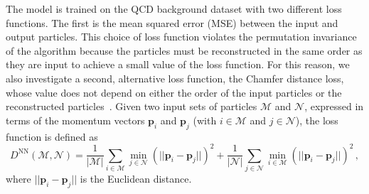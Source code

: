 \documentclass[letterpaper,11pt]{article}
\begin{document}
The model is trained on the QCD background dataset with two different loss functions. 
The first is the mean squared error (MSE) between the input and output particles. 
This choice of loss function violates the permutation invariance of the algorithm because the particles must be reconstructed in the same order as they are input to achieve a small value of the loss function.
For this reason, we also investigate a second, alternative loss function, the Chamfer distance loss, whose value does not depend on either the order of the input particles or the reconstructed particles~\cite{10.5555/1622943.1622971,Fan_2017_CVPR,Zhang2020FSPool}.
Given two input sets of particles $\mathcal{M}$ and $\mathcal{N}$, expressed in terms of the momentum vectors $\boldsymbol{p}_i$ and $\boldsymbol{p}_j$ (with $i \in \mathcal{M}$ and $j \in \mathcal{N}$), the loss function is defined as
\begin{equation}
D^\mathrm{NN}(\mathcal{M}, \mathcal{N}) =  \frac{1}{|\mathcal{M}|}\sum_{i \in \mathcal{M}} \min_{j \in \mathcal{N}} \left(||\boldsymbol{p}_i - \boldsymbol{p}_j||\right)^2 + \frac{1}{|\mathcal{N}|}\sum_{j \in \mathcal{N}} \min_{i \in \mathcal{M}} \left(||\boldsymbol{p}_i - \boldsymbol{p}_j||\right)^2\,,
\label{eq:L_NND}
\end{equation}
where $||\boldsymbol{p}_i-\boldsymbol{p}_j||$ is the Euclidean distance.
\end{document}
